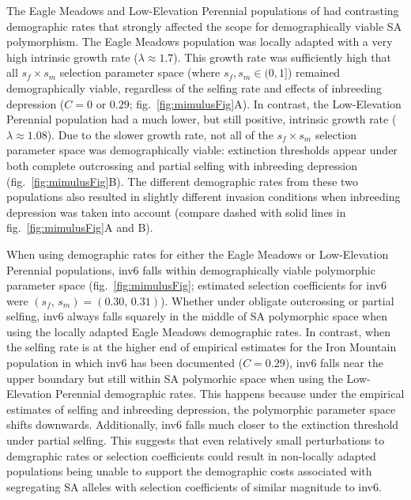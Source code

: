 \documentclass[11pt]{article}
\begin{document}
The Eagle Meadows and Low-Elevation Perennial populations of \citet{PetersonEtAl2016} had contrasting demographic rates that strongly affected the scope for demographically viable SA polymorphism. The Eagle Meadows population was locally adapted with a very high intrinsic growth rate ($\lambda \approx 1.7$). This growth rate was sufficiently high that all $s_f \times s_m$ selection parameter space (where $s_f, s_m \in (0,1]$) remained demographically viable, regardless of the selfing rate and effects of inbreeding depression ($C = 0$ or $0.29$; fig.~\ref{fig:mimulusFig}A). In contrast, the Low-Elevation Perennial population had a much lower, but still positive, intrinsic growth rate ($\lambda \approx 1.08$). Due to the slower growth rate, not all of the $s_f \times s_m$ selection parameter space was demographically viable: extinction thresholds appear under both complete outcrossing and partial selfing with inbreeding depression (fig.~\ref{fig:mimulusFig}B). The different demographic rates from these two populations also resulted in slightly different invasion conditions when inbreeding depression was taken into account (compare dashed with solid lines in fig.~\ref{fig:mimulusFig}A and B).

When using demographic rates for either the Eagle Meadows or Low-Elevation Perennial populations, inv6 falls within demographically viable polymorphic parameter space (fig.~\ref{fig:mimulusFig}; estimated selection coefficients for inv6 were $(s_f,\,s_m) = (0.30,\, 0.31)$). Whether under obligate outcrossing or partial selfing, inv6 always falls squarely in the middle of SA polymorphic space when using the locally adapted Eagle Meadows demographic rates. In contrast, when the selfing rate is at the higher end of empirical estimates for the Iron Mountain population in which inv6 has been documented ($C = 0.29$), inv6 falls near the upper boundary but still within SA polymorhic space when using the Low-Elevation Perennial demographic rates. This happens because under the empirical estimates of selfing and inbreeding depression, the polymorphic parameter space shifts downwards. Additionally, inv6 falls much closer to the extinction threshold under partial selfing. This suggests that even relatively small perturbations to demgraphic rates or selection coefficients could result in non-locally adapted populations being unable to support the demographic costs associated with segregating SA alleles with selection coefficients of similar magnitude to inv6. 
\end{document}
